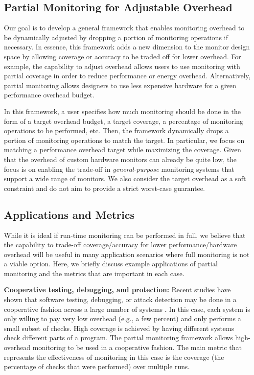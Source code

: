 \subsection{Partial Monitoring for Adjustable Overhead}

Our goal is to develop a general framework that enables monitoring
overhead to be dynamically adjusted by dropping a portion of monitoring
operations if necessary. In essence, this framework adds a new dimension to the
monitor design space by allowing coverage or accuracy to be traded off for
lower overhead. For example, the capability to adjust overhead allows users to
use monitoring with partial coverage in order to reduce performance or energy
overhead. Alternatively, partial monitoring allows designers to use less
expensive hardware for a given performance overhead budget.

In this framework, a user specifies how much monitoring should be done in the
form of a target overhead budget, a target coverage, a percentage of monitoring
operations to be performed, etc.  Then, the framework dynamically drops a
portion of monitoring operations to match the target. In particular, we
focus on matching a performance overhead target while maximizing the
coverage. Given that the overhead of custom hardware monitors can already be
quite low, the focus is on enabling the trade-off in {\em general-purpose}
monitoring systems that support a wide range of monitors.  We also consider the
target overhead as a soft constraint and do not aim to provide a strict
worst-case guarantee.

\subsection{Applications and Metrics}

While it is ideal if run-time monitoring can be performed in full, we believe
that the capability to trade-off coverage/accuracy for lower
performance/hardware overhead will be useful in many application scenarios
where full monitoring is not a viable option.  Here, we briefly discuss example
applications of partial monitoring and the metrics that are important in each
case.

{\bf Cooperative testing, debugging, and protection:} 
Recent studies have shown that software testing, debugging, or attack detection
may be done in a cooperative fashion across a large number of systems
\cite{liblit-pldi05, chilimbi-asplos04, greathouse-cgo11, testudo-micro08}. In
this case, each system is only willing to pay very low overhead (e.g., a few
percent) and only performs a small subset of checks.  High coverage is achieved
by having different systems check different parts of a program.  The partial
monitoring framework allows high-overhead monitoring to be used in a
cooperative fashion.  The main metric that represents the effectiveness of
monitoring in this case is the coverage (the percentage of checks that were
performed) over multiple runs.

